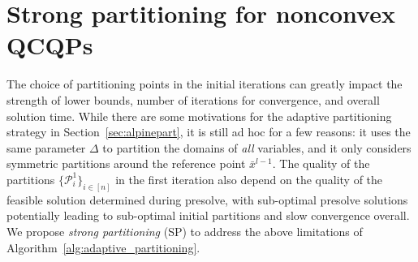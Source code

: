 \documentclass{article}
\begin{document}
\section{Strong partitioning for nonconvex QCQPs}
\label{sec:strongpart}


The choice of partitioning points in the initial iterations can greatly impact the strength of lower bounds, number of iterations for convergence, and overall solution time.
While there are some motivations for the adaptive partitioning strategy in Section~\ref{sec:alpinepart}, it is still ad hoc for a few reasons: it uses the same parameter $\Delta$ to partition the domains of \textit{all} variables, and it only considers symmetric partitions around the reference point $\bar{x}^{l-1}$.
The quality of the partitions $\{\mathcal{P}^1_i\}_{i \in [n]}$ in the first iteration also depend on the quality of the feasible solution determined during presolve, with sub-optimal presolve solutions potentially leading to sub-optimal initial partitions and slow convergence overall.
We propose \textit{strong partitioning} (SP) to address the above limitations of Algorithm~\ref{alg:adaptive_partitioning}.
\end{document}
